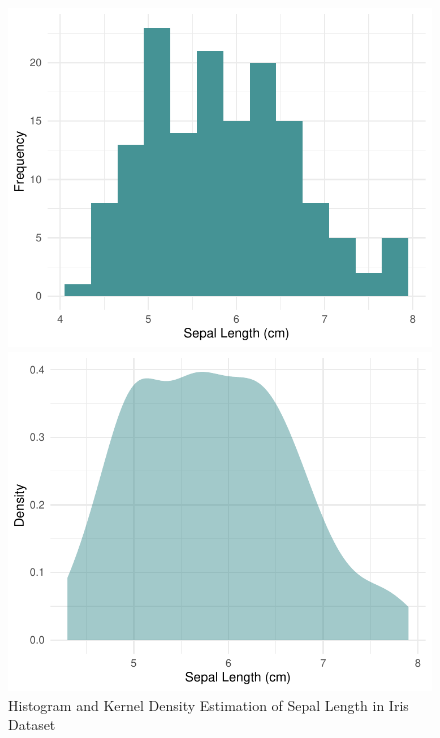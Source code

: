 \documentclass{article}\usepackage[]{graphicx}\usepackage[]{xcolor}
\newenvironment{knitrout}{}{} %
\numberwithin{equation}{section}
\begin{document}
\begin{figure}[htbp]
  \centering
  \begin{minipage}[b]{0.48\linewidth}
\begin{knitrout}\scriptsize
{}\color{fgcolor}

{\centering \includegraphics[width=\linewidth]{figure/beamer-hist2-1} 

}


\end{knitrout}
  \end{minipage}
  \hfill
  \begin{minipage}[b]{0.48\linewidth}
\begin{knitrout}\scriptsize
{}\color{fgcolor}

{\centering \includegraphics[width=\linewidth]{figure/beamer-kde3-1} 

}


\end{knitrout}
  \end{minipage}
  \caption{Histogram and Kernel Density Estimation of Sepal Length in Iris Dataset}
  \label{fig:iris-plots}
\end{figure}
\end{document}
